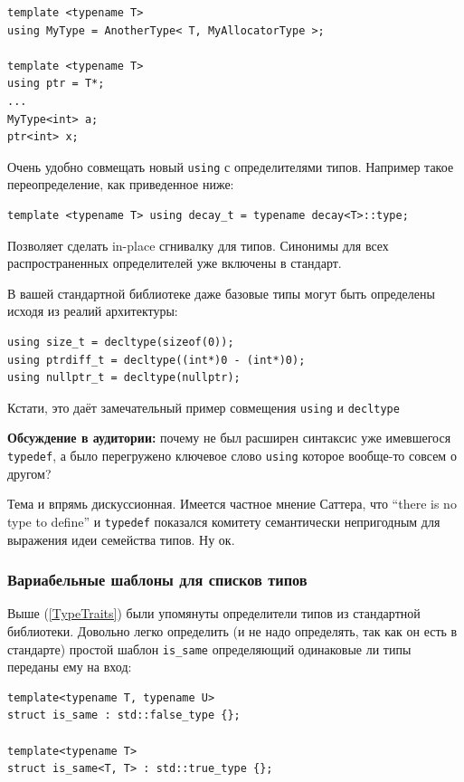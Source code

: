 \documentclass[a4paper,12pt,oneside]{article}
\begin{document}
\begin{lstlisting}
template <typename T> 
using MyType = AnotherType< T, MyAllocatorType >; 

template <typename T> 
using ptr = T*;
...
MyType<int> a;
ptr<int> x;
\end{lstlisting}

Очень удобно совмещать новый \lstinline!using! с определителями типов. Например такое переопределение, как приведенное ниже:

\begin{lstlisting}
template <typename T> using decay_t = typename decay<T>::type;
\end{lstlisting}

Позволяет сделать in-place сгнивалку для типов. Синонимы для всех распространенных определителей уже включены в стандарт.

В вашей стандартной библиотеке даже базовые типы могут быть определены исходя из реалий архитектуры:

\begin{lstlisting}
using size_t = decltype(sizeof(0));
using ptrdiff_t = decltype((int*)0 - (int*)0);
using nullptr_t = decltype(nullptr);
\end{lstlisting}

Кстати, это даёт замечательный пример совмещения \lstinline!using! и \lstinline!decltype!

\textbf{Обсуждение в аудитории:} почему не был расширен синтаксис уже имевшегося \lstinline!typedef!, а было перегружено ключевое слово \lstinline!using! которое вообще-то совсем о другом?

Тема и впрямь дискуссионная. Имеется частное мнение Саттера, что ``there is no type to define'' и \lstinline!typedef! показался комитету семантически непригодным для выражения идеи семейства типов. Ну ок.

\subsubsection{Вариабельные шаблоны для списков типов}

Выше (\ref{TypeTraits}) были упомянуты определители типов из стандартной библиотеки. Довольно легко определить (и не надо определять, так как он есть в стандарте) простой шаблон \lstinline!is_same! определяющий одинаковые ли типы переданы ему на вход:

\begin{lstlisting}
template<typename T, typename U>
struct is_same : std::false_type {};
 
template<typename T>
struct is_same<T, T> : std::true_type {};
\end{lstlisting}
\end{document}
